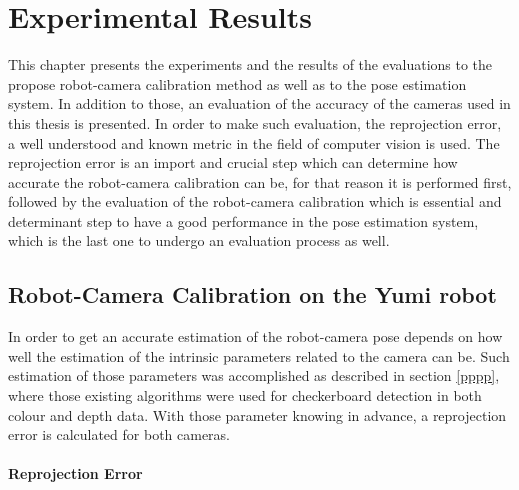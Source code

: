 
\chapter{Experimental Results}
\label{chap:exp}

This chapter presents the experiments and the results of the evaluations to the propose robot-camera calibration method as well as to the pose estimation system. In addition to those, an evaluation of the accuracy of the cameras used in this thesis is presented. In order to make such evaluation, the reprojection error, a well understood and known metric in the field of computer vision is used. The reprojection error is an import and crucial step which can determine how accurate the robot-camera calibration can be, for that reason it is performed first, followed by the evaluation of the robot-camera calibration which is essential and determinant step to have a good performance in the pose estimation system, which is the last one to undergo an evaluation process as well.

\section{Robot-Camera Calibration on the Yumi robot}
In order to get an accurate estimation of the robot-camera pose depends on how well the estimation of the intrinsic parameters related to the camera can be. Such estimation of those parameters was accomplished as described in section \ref{pppp}, where those existing algorithms were used for checkerboard detection in both colour and depth data. With those parameter knowing in advance, a reprojection error is calculated for both cameras. 

\subsubsection{Reprojection Error}

